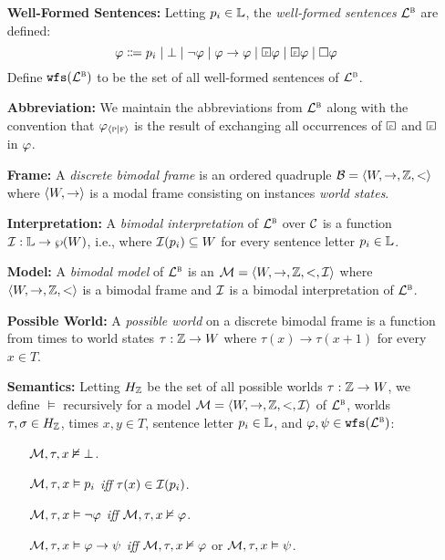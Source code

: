 \documentclass[a4paper, 11pt]{article} %
\begin{document}
\begin{enumerate}[leftmargin=1.2in]
	\item[\bf Well-Formed Sentences:] Letting $p_i \in \mathbb{L}$, the \textit{well-formed sentences} $\mathcal{L}^{\textsc{b}}$ are defined:
    \[ \metaA \Coloneq p_i \mid 
      \bot \mid 
      \neg\metaA \mid 
      \metaA \rightarrow \metaA \mid 
      \Past\metaA \mid 
      \Future\metaA \mid
      \Box\metaA
    \]
    Define $\texttt{wfs}(\mathcal{L}^{\textsc{b}})$ to be the set of all well-formed sentences of $\mathcal{L}^{\textsc{b}}$.
  \item[\bf Abbreviation:] We maintain the abbreviations from $\mathcal{L}^{\textsc{b}}$ along with the convention that $\varphi_{\langle\textsc{p} | \textsc{f}\rangle}$ is the result of exchanging all occurrences of $\Past$ and $\Future$ in $\varphi$.
  \item[\bf Frame:] A \textit{discrete bimodal frame} is an ordered quadruple $\mathcal{B} = \langle W, \to, \mathbb{Z}, <\rangle$ where $\langle W, \to\rangle$ is a modal frame consisting on instances \textit{world states}. 
  \item[\bf Interpretation:] A \textit{bimodal interpretation} of $\mathcal{L}^{\textsc{b}}$ over $\mathcal{C}$ is a function $\mathcal{I} : \mathbb{L} \to \wp(W)$, i.e., where $\mathcal{I}(p_i) \subseteq W$ for every sentence letter $p_i \in \mathbb{L}$. 
  \item[\bf Model:] A \textit{bimodal model} of $\mathcal{L}^{\textsc{b}}$ is an $\mathcal{M} = \langle W, \to, \mathbb{Z}, <, \mathcal{I}\rangle$ where $\langle W, \to, \mathbb{Z}, <\rangle$ is a bimodal frame and $\mathcal{I}$ is a bimodal interpretation of $\mathcal{L}^{\textsc{b}}$.
  \item[\bf Possible World:] A \textit{possible world} on a discrete bimodal frame is a function from times to world states $\tau : \mathbb{Z} \to W$ where $\tau(x) \to \tau(x + 1)$ for every $x \in T$.
  \item[\bf Semantics:] Letting $H_{\mathbb{Z}}$ be the set of all possible worlds $\tau : \mathbb{Z} \to W$, we define $\vDash$ recursively for a model $\mathcal{M} = \langle W, \to, \mathbb{Z}, <, \mathcal{I}\rangle$ of $\mathcal{L}^{\textsc{b}}$, worlds $\tau, \sigma \in H_{\mathbb{Z}}$, times $x, y \in T$, sentence letter $p_i \in \mathbb{L}$, and $\varphi, \psi \in \texttt{wfs}(\mathcal{L}^{\textsc{b}})$:
    \begin{itemize}[leftmargin=.15in]\small
      \item[] $\mathcal{M}, \tau, x \nvDash \bot$.
      \item[] $\mathcal{M}, \tau, x \vDash p_i$ \textit{iff} $\tau(x) \in \mathcal{I}(p_i)$.
      \item[] $\mathcal{M}, \tau, x \vDash \neg \varphi$ \textit{iff} $\mathcal{M}, \tau, x\nvDash \varphi$.
      \item[] $\mathcal{M}, \tau, x \vDash \varphi\rightarrow \psi$ \textit{iff} $\mathcal{M}, \tau, x\nvDash \varphi$ or $\mathcal{M}, \tau, x \vDash  \psi$.

\end{itemize}
\end{enumerate}
\end{document}
